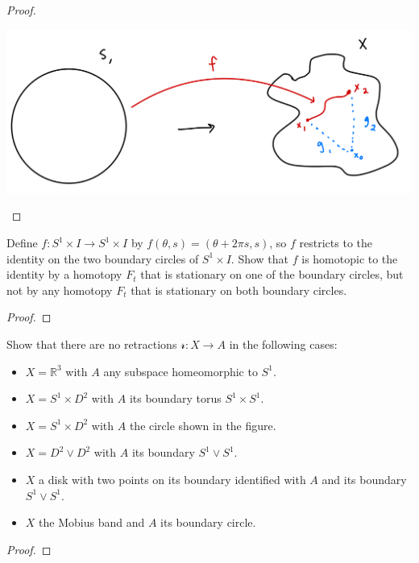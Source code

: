 \documentclass[12pt]{article}
\newenvironment{statement}[2][Statement]{\begin{trivlist}
\item[\hskip \labelsep {\bfseries #1}\hskip \labelsep {\bfseries #2.}]}{\end{trivlist}}
\begin{document}
\begin{proof}
\begin{itemize}
      \begin{center} \includegraphics[scale=.3]{4.png} \end{center}
  \end{itemize}
\end{proof}

\begin{statement}[Problem]{5}
  Define $f:S^1 \times I \to S^1 \times I$ by $f(\theta, s)=(\theta + 2\pi s, s)$, so $f$ restricts to the identity on the
  two boundary circles of $S^1 \times I$. Show that $f$ is homotopic to the identity by a homotopy 
  $F_t$ that is stationary on one of the boundary circles, but not by any homotopy $F_t$ that is stationary on both boundary circles. 
\end{statement}
\begin{proof}
  
\end{proof}

\begin{statement}[Problem]{6}
  Show that there are no retractions $\mathcal{r}:X \to A$ in the following cases:
  \begin{itemize}
    \item[(a)] $X = \mathbb{R}^3$ with $A$ any subspace homeomorphic to $S^1$.
    \item[(b)] $X=S^1 \times D^2$ with $A$ its boundary torus $S^1 \times S^1$. 
    \item[(c)]$X = S^1 \times D^2$ with $A$ the circle shown in the figure.
    \item[(d)] $X = D^2 \vee D^2$ with $A$ its boundary $S^1 \vee S^1$.
    \item[(e)] $X$ a disk with two points on its boundary identified with $A$ and its boundary $S^1 \vee S^1$. 
    \item[(f)]$X$ the Mobius band and $A$ its boundary circle. 
  \end{itemize}
\end{statement}
\begin{proof}

\end{proof}
\end{document}
